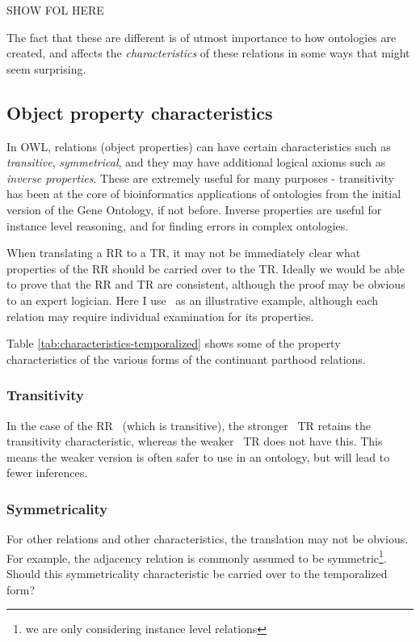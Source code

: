 \documentclass{bioinfo}
\def\partOf{\pr{part\_of}}
\def\atAllTimes{\pr{at-all-times}}
\def\atSomeTimes{\pr{at-some-times}}
\begin{document}
SHOW FOL HERE

The fact that these are different is of utmost importance to how
ontologies are created, and affects the \emph{characteristics} of
these relations in some ways that might seem surprising.

\subsection{Object property characteristics}

In OWL, relations (object properties) can have certain characteristics
such as \emph{transitive}, \emph{symmetrical}, and they may have
additional logical axioms such as \emph{inverse properties}. These are
extremely useful for many purposes - transitivity has been at the core
of bioinformatics applications of ontologies from the initial version
of the Gene Ontology\cite{Ashburner2000}, if not before. Inverse
properties are useful for instance level reasoning, and for finding
errors in complex ontologies.

When translating a RR to a TR, it may not be immediately clear what
properties of the RR should be carried over to the TR. Ideally we
would be able to prove that the RR and TR are consistent, although the
proof may be obvious to an expert logician. Here I use \partOf\ as an
illustrative example, although each relation may require individual
examination for its properties.

Table \ref{tab:characteristics-temporalized} shows some of the
property characteristics of the various forms of the continuant
parthood relations.

\subsubsection{Transitivity}

In the case of the RR \partOf\ (which is transitive), the stronger
\atAllTimes\ TR retains the transitivity characteristic, whereas the
weaker \atSomeTimes\ TR does not have this. This means the weaker
version is often safer to use in an ontology, but will lead to fewer
inferences.

\subsubsection{Symmetricality}

For other relations and other characteristics, the translation may not
be obvious. For example, the adjacency relation is commonly assumed to
be symmetric\footnote{we are only considering instance level
  relations}. Should this symmetricality characteristic be carried
over to the temporalized form?
\end{document}
